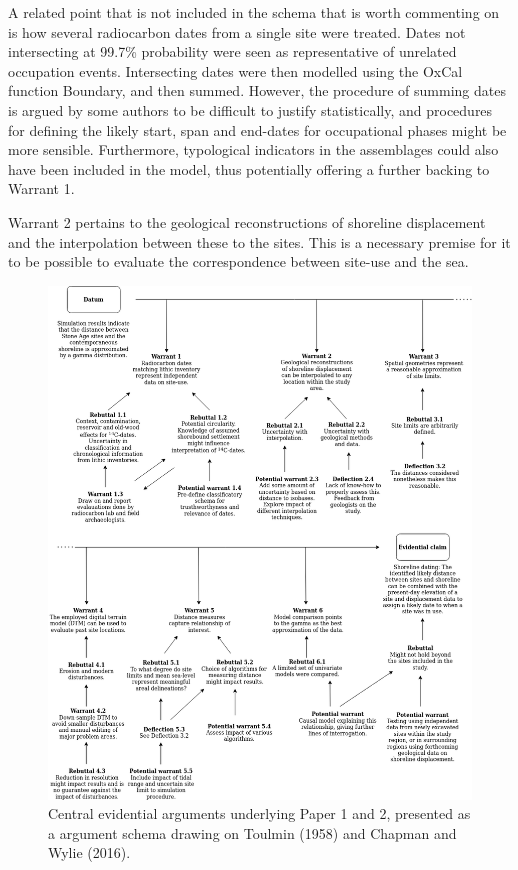 \documentclass[
  a4paper,
  oneside]{uiophdthesis}
\begin{document}
A related point that is not included in the schema that is worth commenting on is how several radiocarbon dates from a single site were treated. Dates not intersecting at 99.7\% probability were seen as representative of unrelated occupation events. Intersecting dates were then modelled using the OxCal function Boundary, and then summed. However, the procedure of summing dates is argued by some authors to be difficult to justify statistically, and procedures for defining the likely start, span and end-dates for occupational phases might be more sensible. Furthermore, typological indicators in the assemblages could also have been included in the model, thus potentially offering a further backing to Warrant 1.

Warrant 2 pertains to the geological reconstructions of shoreline displacement and the interpolation between these to the sites. This is a necessary premise for it to be possible to evaluate the correspondence between site-use and the sea.

\begin{figure}

{\centering \includegraphics[width=0.95\linewidth]{figures/toulmin_p1} 

}

\caption{Central evidential arguments underlying Paper 1 and 2, presented as a argument schema drawing on Toulmin (1958) and Chapman and Wylie (2016).}\label{fig:t1}
\end{figure}
\end{document}
